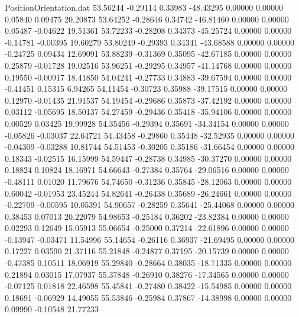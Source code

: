 \begin{filecontents}{PositionOrientation.dat}
  53.56244   -0.29114    0.33983   -48.43295    0.00000    0.00000    0.05840    0.09475   20.20873
  53.64252   -0.28646    0.34742   -46.81460    0.00000    0.00000    0.05487   -0.04622   19.51361
  53.72233   -0.28208    0.34373   -45.25724    0.00000    0.00000   -0.14781   -0.00395   19.60279
  53.80249   -0.29393    0.34341   -43.68588    0.00000    0.00000   -0.24725    0.09434   12.69091
  53.88239   -0.31369    0.35095   -42.67185    0.00000    0.00000    0.25879   -0.01728   19.02516
  53.96251   -0.29295    0.34957   -41.14768    0.00000    0.00000    0.19550   -0.00917   18.41850
  54.04241   -0.27733    0.34883   -39.67594    0.00000    0.00000   -0.41451    0.15315    6.94265
  54.11454   -0.30723    0.35988   -39.17515    0.00000    0.00000    0.12970   -0.01435   21.91537
  54.19454   -0.29686    0.35873   -37.42192    0.00000    0.00000    0.03112   -0.05695   18.50137
  54.27459   -0.29436    0.35418   -35.94106    0.00000    0.00000    0.00529    0.03425   19.99928
  54.35456   -0.29394    0.35691   -34.34154    0.00000    0.00000   -0.05826   -0.03037   22.64721
  54.43458   -0.29860    0.35448   -32.52935    0.00000    0.00000   -0.04309   -0.03288   10.81744
  54.51453   -0.30205    0.35186   -31.66454    0.00000    0.00000    0.18343   -0.02515   16.15999
  54.59447   -0.28738    0.34985   -30.37270    0.00000    0.00000    0.18824    0.10824   18.16971
  54.66643   -0.27384    0.35764   -29.06516    0.00000    0.00000   -0.48111    0.01020   11.79676
  54.74650   -0.31236    0.35845   -28.12063    0.00000    0.00000    0.60042   -0.01953   23.45244
  54.82641   -0.26438    0.35689   -26.24661    0.00000    0.00000   -0.22709   -0.00595   10.05391
  54.90657   -0.28259    0.35641   -25.44068    0.00000    0.00000    0.38453    0.07013   20.22079
  54.98653   -0.25184    0.36202   -23.82384    0.00000    0.00000    0.02293    0.12649   15.05913
  55.06654   -0.25000    0.37214   -22.61896    0.00000    0.00000   -0.13947   -0.03471   11.54996
  55.14654   -0.26116    0.36937   -21.69495    0.00000    0.00000    0.17227    0.03590   21.37116
  55.21848   -0.24877    0.37195   -20.15739    0.00000    0.00000   -0.47385    0.10511   18.06919
  55.29840   -0.28664    0.38035   -18.71335    0.00000    0.00000    0.21894    0.03015   17.07937
  55.37848   -0.26910    0.38276   -17.34565    0.00000    0.00000   -0.07125    0.01818   22.46598
  55.45841   -0.27480    0.38422   -15.54985    0.00000    0.00000    0.18691   -0.06929   14.49055
  55.53846   -0.25984    0.37867   -14.38998    0.00000    0.00000    0.09990   -0.10548   21.77233

\end{filecontents}
